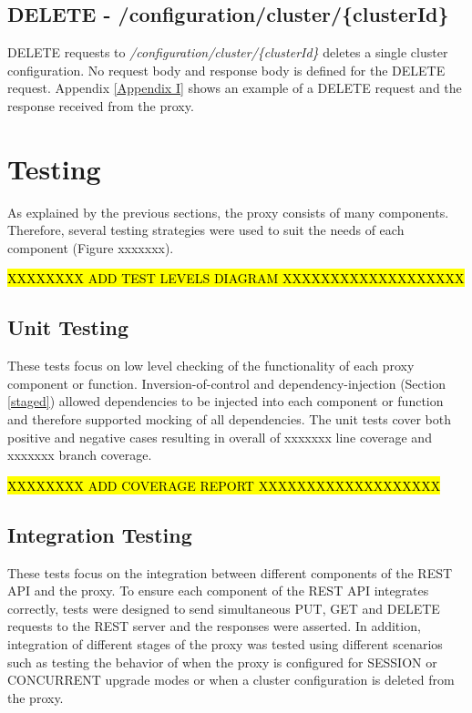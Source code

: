 \documentclass[a4paper,11pt,twoside]{report}
\begin{document}
\subsection{DELETE - /configuration/cluster/\{clusterId\}}
DELETE requests to \textit{/configuration/cluster/\{clusterId\}} deletes a single cluster configuration. No request body and response body is defined for the DELETE request. Appendix \ref{Appendix I} shows an example of a DELETE request and the response received from the proxy.

\section{Testing}
As explained by the previous sections, the proxy consists of many components. Therefore, several testing strategies were used to suit the needs of each component (Figure xxxxxxx).\bigskip

\hl{XXXXXXXX ADD TEST LEVELS DIAGRAM  XXXXXXXXXXXXXXXXXXX}\bigskip

\subsection{Unit Testing}
These tests focus on low level checking of the functionality of each proxy component or function. Inversion-of-control and dependency-injection (Section \ref{staged}) allowed dependencies to be injected into each component or function and therefore supported mocking of all dependencies. The unit tests cover both positive and negative cases resulting in overall of xxxxxxx line coverage and xxxxxxx branch coverage.\bigskip    

\hl{XXXXXXXX ADD COVERAGE REPORT XXXXXXXXXXXXXXXXXXX}\bigskip

\subsection{Integration Testing}
These tests focus on the integration between different components of the REST API and the proxy. To ensure each component of the REST API integrates correctly, tests were designed to send simultaneous PUT, GET and DELETE requests to the REST server and the responses were asserted. In addition, integration of different stages of the proxy was tested using different scenarios such as testing the behavior of when the proxy is configured for SESSION or CONCURRENT upgrade modes or when a cluster configuration is deleted from the proxy.
\end{document}
